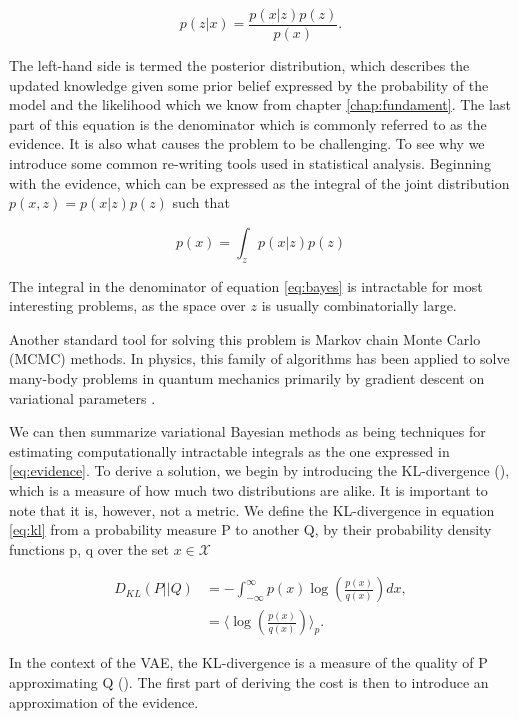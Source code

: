  \begin{equation}\label{eq:bayes}
 p(z| x) = \frac{p(x|z) p(z)}{p(x)}.
 \end{equation}

 \noindent The left-hand side is termed the posterior distribution, which describes the updated knowledge given some prior belief expressed by the probability of the model and the likelihood which we know from chapter \ref{chap:fundament}. The last part of this equation is the denominator which is commonly referred to as the evidence. It is also what causes the problem to be challenging. To see why we introduce some common re-writing tools used in statistical analysis. Beginning with the evidence, which can be expressed as the integral of the joint distribution $p(x, z) = p(x|z)p(z)$ such that

\begin{equation}\label{eq:evidence}
p(x) = \int_z p(x|z)p(z)
\end{equation}

\noindent The integral in the denominator of equation \ref{eq:bayes} is intractable for most interesting problems, as the space over $z$ is usually combinatorially large. 

Another standard tool for solving this problem is Markov chain Monte Carlo (MCMC) methods. In physics, this family of algorithms has been applied to solve many-body problems in quantum mechanics primarily by gradient descent on variational parameters \cite{Hjorth-Jensen}.

We can then summarize variational Bayesian methods as being techniques for estimating computationally intractable integrals as the one expressed in \ref{eq:evidence}. To derive a solution, we begin by introducing the KL-divergence (\cite{Kullback1951}), which is a measure of how much two distributions are alike. It is important to note that it is, however, not a metric. We define the KL-divergence in equation \ref{eq:kl} from a probability measure P to another Q, by their probability density functions p, q over the set $x \in \mathcal{X}$

\begin{align}\label{eq:kl}
D_{KL} (P || Q) &= - \int^{\infty}_{-\infty} p(x) \log \left(\frac{p(x)}{q(x)}\right) dx, \\
&= \langle \log \left(\frac{p(x)}{q(x)} \right)\rangle_{p}.
\end{align}

\noindent In the context of the VAE, the KL-divergence is a measure of the quality of P approximating Q (\cite{Burnham2002}). The first part of deriving the cost is then to introduce an approximation of the evidence. 


